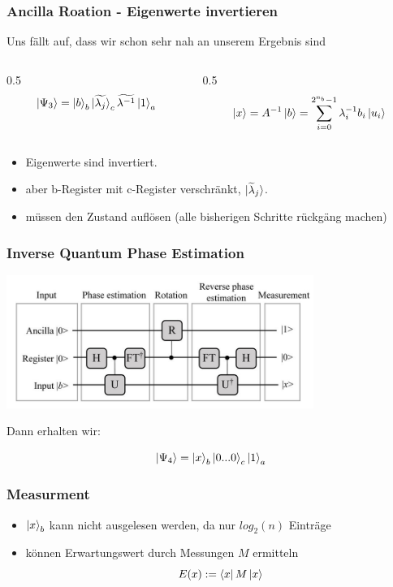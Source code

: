 \begin{frame}
    \frametitle{Ancilla Roation - Eigenwerte invertieren}

    Uns fällt auf, dass wir schon sehr nah an unserem Ergebnis sind
    \begin{columns}[c]
        \begin{column}{0.5\hsize}\centering
        $$\ket{\Psi_3} = \ket{b}_b \ket{\widetilde{\lambda_j}}_c \widetilde{\lambda^{-1}} \ket{1}_a$$
        \end{column}
        \begin{column}{0.5\hsize}
        $$\ket{x} =  A^{-1} \ket{b} = \sum_{i=0}^{2^{n_b}-1} \lambda_i^{-1} b_i\ket{u_i}$$
        \end{column}
    \end{columns}

    \hfil

    \begin{itemize}
        \item Eigenwerte sind invertiert.
        \item aber b-Register mit c-Register verschränkt, $\ket{\widetilde{\lambda}_j}$.
        \item müssen den Zustand auflösen (alle bisherigen Schritte rückgäng machen)
    \end{itemize}



\end{frame}


\begin{frame}

    \frametitle{Inverse Quantum Phase Estimation}
    \begin{center}
    \includegraphics[width=10cm]{img/hhl_circuit.jpg}
    \end{center}

    Dann erhalten wir:

    $$\ket{\Psi_4} = \ket{x}_b \ket{0...0}_c\ket{1}_a$$


\end{frame}


\begin{frame}
    \frametitle{Measurment}
    
    \begin{itemize}
        \item $\ket{x}_b$ kann nicht ausgelesen werden, da nur $log_2(n)$ Einträge 
        \item können Erwartungswert durch Messungen $M$ ermitteln
        $$ E(x) := \bra{x}M\ket{x} $$

    \end{itemize}
\end{frame}

